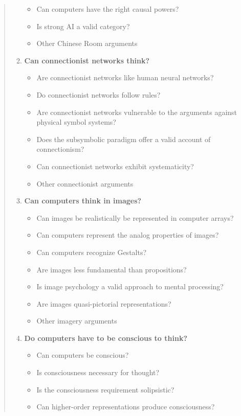\documentclass[11pt]{thesis} %
\begin{document}
\begin{quotation}
\begin{enumerate}
\begin{itemize}
        \item Can computers have the right causal powers?
        \item Is strong AI a valid category?
        \item Other Chinese Room arguments
      \end{itemize}
    \item \textbf{Can connectionist networks think?}
      \begin{itemize}
        \item Are connectionist networks like human neural networks?
        \item Do connectionist networks follow rules?
        \item Are connectionist networks vulnerable to the arguments against physical symbol systems?
        \item Does the subsymbolic paradigm offer a valid account of connectionism?
        \item Can connectionist networks exhibit systematicity?
        \item Other connectionist arguments
      \end{itemize}
    \item \textbf{Can computers think in images?}
      \begin{itemize}
        \item Can images be realistically be represented in computer arrays?
        \item Can computers represent the analog properties of images?
        \item Can computers recognize Gestalts?
        \item Are images less fundamental than propositions?
        \item Is image psychology a valid approach to mental processing?
        \item Are images quasi-pictorial representations?
        \item Other imagery arguments
      \end{itemize}
    \item \textbf{Do computers have to be conscious to think?}
      \begin{itemize}
        \item Can computers be conscious?
        \item Is consciousness necessary for thought?
        \item Is the consciousness requirement solipsistic?
        \item Can higher-order representations produce consciousness?

\end{itemize}
\end{enumerate}
\end{quotation}
\end{document}
